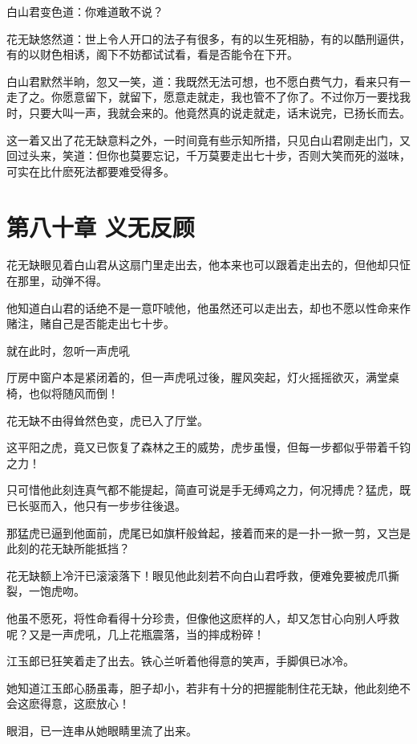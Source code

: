 \documentclass[12pt,oneside]{book}
\begin{document}
白山君变色道：你难道敢不说？

花无缺悠然道：世上令人开口的法子有很多，有的以生死相胁，有的以酷刑逼供，有的以财色相诱，阁下不妨都试试看，看是否能令在下开。

白山君默然半晌，忽又一笑，道：我既然无法可想，也不愿白费气力，看来只有一走了之。你愿意留下，就留下，愿意走就走，我也管不了你了。不过你万一要找我时，只要大叫一声，我就会来的。他竟然真的说走就走，话末说完，已扬长而去。

这一着又出了花无缺意料之外，一时间竟有些示知所措，只见白山君刚走出门，又回过头来，笑道：但你也莫要忘记，千万莫要走出七十步，否则大笑而死的滋味，可实在比什麽死法都要难受得多。

\hypertarget{ux7b2cux516bux5341ux7ae0-ux4e49ux65e0ux53cdux987e}{%
\chapter{第八十章
义无反顾}\label{ux7b2cux516bux5341ux7ae0-ux4e49ux65e0ux53cdux987e}}

花无缺眼见着白山君从这扇门里走出去，他本来也可以跟着走出去的，但他却只怔在那里，动弹不得。

他知道白山君的话绝不是一意吓唬他，他虽然还可以走出去，却也不愿以性命来作赌注，赌自己是否能走出七十步。

就在此时，忽听一声虎吼

厅房中窗户本是紧闭着的，但一声虎吼过後，腥风突起，灯火摇摇欲灭，满堂桌椅，也似将随风而倒！

花无缺不由得耸然色变，虎已入了厅堂。

这平阳之虎，竟又已恢复了森林之王的威势，虎步虽慢，但每一步都似乎带着千钧之力！

只可惜他此刻连真气都不能提起，简直可说是手无缚鸡之力，何况搏虎？猛虎，既已长驱而入，他只有一步步往後退。

那猛虎已逼到他面前，虎尾已如旗杆般耸起，接着而来的是一扑一掀一剪，又岂是此刻的花无缺所能抵挡？

花无缺额上冷汗已滚滚落下！眼见他此刻若不向白山君呼救，便难免要被虎爪撕裂，一饱虎吻。

他虽不愿死，将性命看得十分珍贵，但像他这麽样的人，却又怎甘心向别人呼救呢？又是一声虎吼，几上花瓶震落，当的摔成粉碎！

江玉郎已狂笑着走了出去。铁心兰听着他得意的笑声，手脚俱已冰冷。

她知道江玉郎心肠虽毒，胆子却小，若非有十分的把握能制住花无缺，他此刻绝不会这麽得意，这麽放心！

眼泪，已一连串从她眼睛里流了出来。
\end{document}

